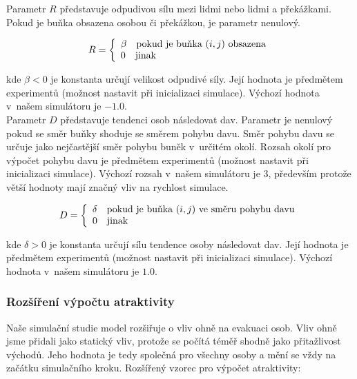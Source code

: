\documentclass[11pt, titlepage, a4paper]{article}
\begin{document}
        Parametr $R$ představuje odpudivou sílu mezi lidmi nebo lidmi a překážkami. Pokud je buňka obsazena osobou či překážkou, je parametr nenulový.

        \begin{equation}
        \label{eq_R}
        R = \left\{
        \begin{array}{l}
            \beta \textrm{\quad pokud je buňka $(i,j)$ obsazena}\\
            0 \textrm{\quad jinak}\\
        \end{array} 
        \right. 
        \end{equation}

        kde $\beta < 0$ je konstanta určují velikost odpudivé síly. Její hodnota je předmětem experimentů (možnost nastavit při inicializaci simulace). Výchozí hodnota v~našem simulátoru je $-1.0$.\\

        Parametr $D$ představuje tendenci osob následovat dav. Parametr je nenulový pokud se směr buňky shoduje se směrem pohybu davu. Směr pohybu davu se určuje jako nejčastější směr pohybu buněk v~určitém okolí. Rozsah okolí pro výpočet pohybu davu je předmětem experimentů (možnost nastavit při inicializaci simulace). Výchozí rozsah v~našem simulátoru je $3$, především protože větší hodnoty mají značný vliv na rychlost simulace.

        \begin{equation}
        \label{eq_D}
        D = \left\{
        \begin{array}{l}
            \delta \textrm{\quad pokud je buňka $(i,j)$ ve směru pohybu davu}\\
            0 \textrm{\quad jinak}\\
        \end{array} 
        \right. 
        \end{equation}

        kde $\delta > 0$ je konstanta určují sílu tendence osoby následovat dav. Její hodnota je předmětem experimentů (možnost nastavit při inicializaci simulace). Výchozí hodnota v~našem simulátoru je $1.0$.\\

        \subsubsection{Rozšíření výpočtu atraktivity}
        Naše simulační studie model rozšiřuje o vliv ohně na evakuaci osob. Vliv ohně jsme přidali jako statický vliv, protože se počítá téměř shodně jako přitažlivost východů. Jeho hodnota je tedy společná pro všechny osoby a mění se vždy na začátku simulačního kroku. Rozšířený vzorec pro výpočet atraktivity:
\end{document}
